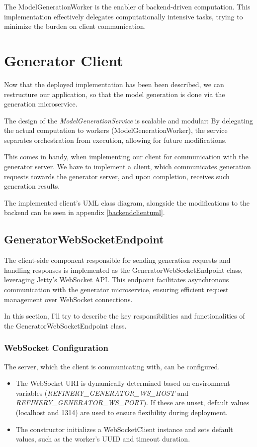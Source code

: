 			The ModelGenerationWorker is the enabler of backend-driven computation.
			This implementation effectively delegates computationally intensive tasks, trying to minimize 
			the burden on client communication.

	\section{Generator Client} \label{Generator Client}
			Now that the deployed implementation has been been described, we can restructure our application, so that the 
			model generation is done via the generation microservice.

			The design of the \textit{ModelGenerationService} is scalable and modular:
			By delegating the actual computation to workers (ModelGenerationWorker), the service separates orchestration from execution, 
			allowing for future modifications. 
			
			This comes in handy, when implementing our client for communication with
			the generator server. We have to implement a client, which communicates generation requests towards the generator server,
			and upon completion, receives such generation results.

			The implemented client's UML class diagram, alongside the modifications to the backend can be seen in appendix \ref{backendclientuml}.

			\subsection{GeneratorWebSocketEndpoint}
			The client-side component responsible for sending generation requests and handling responses is implemented as the GeneratorWebSocketEndpoint class,
			leveraging Jetty's WebSocket API. This endpoint facilitates asynchronous communication with the generator microservice, 
			ensuring efficient request management over WebSocket connections. 

			In this section, I'll try to describe the key responsibilities and functionalities of the GeneratorWebSocketEndpoint class.
			\subsubsection{WebSocket Configuration} 
				The server, which the client is communicating with, can be configured.
				\begin{itemize}
					\item The WebSocket URI is dynamically determined based on environment variables (\textit{REFINERY\_GENERATOR\_WS\_HOST} 
					and \textit{REFINERY\_GENERATOR\_WS\_PORT}). If these are unset, default values (localhost and 1314) are used to ensure flexibility during deployment.
					\item The constructor initializes a WebSocketClient instance and sets default values, such as the worker's UUID and timeout duration.
				\end{itemize} 
